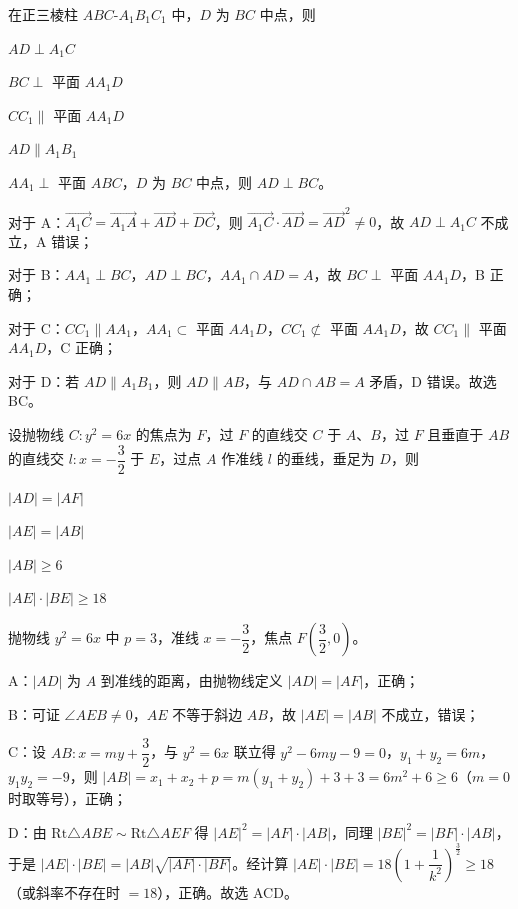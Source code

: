 \documentclass{exam-zh}
\begin{document}
\begin{question}
在正三棱柱 $ABC\text{-}A_{1}B_{1}C_{1}$ 中，$D$ 为 $BC$ 中点，则 \paren[BC]
\begin{choices}
  \item $AD\perp A_{1}C$
  \item $BC\perp$ 平面 $AA_{1}D$
  \item $CC_{1}\parallel$ 平面 $AA_{1}D$
  \item $AD\parallel A_{1}B_{1}$
\end{choices}
\begin{solution}
$AA_{1}\perp$ 平面 $ABC$，$D$ 为 $BC$ 中点，则 $AD\perp BC$。

对于 A：$\overrightarrow{A_{1}C}=\overrightarrow{A_{1}A}+\overrightarrow{AD}+\overrightarrow{DC}$，则 $\overrightarrow{A_{1}C}\cdot\overrightarrow{AD}=\overrightarrow{AD}^{2}\ne 0$，故 $AD\perp A_{1}C$ 不成立，A 错误；

对于 B：$AA_{1}\perp BC$，$AD\perp BC$，$AA_{1}\cap AD=A$，故 $BC\perp$ 平面 $AA_{1}D$，B 正确；

对于 C：$CC_{1}\parallel AA_{1}$，$AA_{1}\subset$ 平面 $AA_{1}D$，$CC_{1}\not\subset$ 平面 $AA_{1}D$，故 $CC_{1}\parallel$ 平面 $AA_{1}D$，C 正确；

对于 D：若 $AD\parallel A_{1}B_{1}$，则 $AD\parallel AB$，与 $AD\cap AB=A$ 矛盾，D 错误。故选 BC。
\end{solution}
\end{question}

\begin{question}
设抛物线 $C\colon y^{2}=6x$ 的焦点为 $F$，过 $F$ 的直线交 $C$ 于 $A$、$B$，过 $F$ 且垂直于 $AB$ 的直线交 $l\colon x=-\dfrac{3}{2}$ 于 $E$，过点 $A$ 作准线 $l$ 的垂线，垂足为 $D$，则 \paren[ACD]
\begin{choices}
  \item $|AD|=|AF|$
  \item $|AE|=|AB|$
  \item $|AB|\ge 6$
  \item $|AE|\cdot|BE|\ge 18$
\end{choices}
\begin{solution}
抛物线 $y^{2}=6x$ 中 $p=3$，准线 $x=-\dfrac32$，焦点 $F\left(\dfrac32,0\right)$。

A：$|AD|$ 为 $A$ 到准线的距离，由抛物线定义 $|AD|=|AF|$，正确；

B：可证 $\angle AEB\ne 0$，$AE$ 不等于斜边 $AB$，故 $|AE|=|AB|$ 不成立，错误；

C：设 $AB\colon x=my+\dfrac32$，与 $y^{2}=6x$ 联立得 $y^{2}-6my-9=0$，$y_{1}+y_{2}=6m$，$y_{1}y_{2}=-9$，则 $|AB|=x_{1}+x_{2}+p=m(y_{1}+y_{2})+3+3=6m^{2}+6\ge 6$（$m=0$ 时取等号），正确；

D：由 $\mathrm{Rt}\triangle ABE\sim\mathrm{Rt}\triangle AEF$ 得 $|AE|^{2}=|AF|\cdot|AB|$，同理 $|BE|^{2}=|BF|\cdot|AB|$，于是 $|AE|\cdot|BE|=|AB|\sqrt{|AF|\cdot|BF|}$。经计算 $|AE|\cdot|BE|=18\left(1+\dfrac1{k^{2}}\right)^{\frac32}\ge 18$（或斜率不存在时 $=18$），正确。故选 ACD。
\end{solution}
\end{question}
\end{document}
